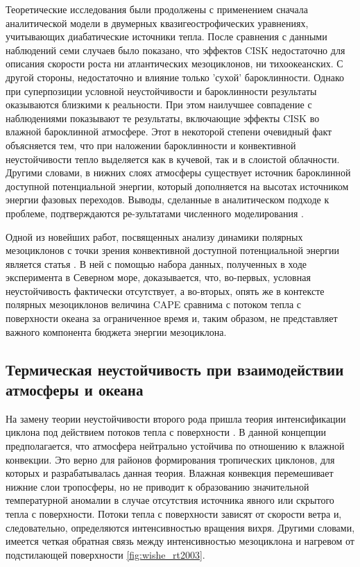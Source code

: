Теоретические исследования были продолжены с применением сначала аналитической модели \citep{SardieWarner1983} в двумерных квазигеострофических уравнениях, учитывающих диабатические источники тепла. После сравнения с данными наблюдений семи случаев было показано, что эффектов CISK недостаточно для описания скорости роста ни атлантических мезоциклонов, ни тихоокеанских. С другой стороны, недостаточно и влияние только 'сухой' бароклинности. Однако при суперпозиции условной неустойчивости и бароклинности результаты оказываются близкими к реальности. При этом наилучшее совпадение с наблюдениями показывают те результаты, включающие эффекты CISK во влажной бароклинной атмосфере. Этот в некоторой степени очевидный факт объясняется тем, что при наложении бароклинности и конвективной неустойчивости тепло выделяется как в кучевой, так и в слоистой облачности. Другими словами, в нижних слоях атмосферы существует источник бароклинной доступной потенциальной энергии, который дополняется на высотах источником энергии фазовых переходов. Выводы, сделанные в аналитическом подходе к проблеме, подтверждаются ре-зультатами численного моделирования \citep{SardieWarner1983}.

Одной из новейших работ, посвященных анализу динамики полярных мезоциклонов с точки зрения конвективной доступной потенциальной энергии является статья \citep{LindersSaetra2010}. В ней с помощью набора данных, полученных в ходе эксперимента в Северном море, доказывается, что, во-первых, условная неустойчивость фактически отсутствует, а во-вторых, опять же в контексте полярных мезоциклонов величина CAPE сравнима с потоком тепла с поверхности океана за ограниченное время и, таким образом, не представляет важного компонента бюджета энергии мезоциклона.

\subsection{Термическая неустойчивость при взаимодействии атмосферы и океана}
На замену теории неустойчивости второго рода пришла теория интенсификации циклона под действием потоков тепла с поверхности \citep{EmanuelRotunno1989}. В данной концепции предполагается, что атмосфера нейтрально устойчива по отношению к влажной конвекции. Это верно для районов формирования тропических циклонов, для которых и разрабатывалась данная теория. Влажная конвекция перемешивает нижние слои тропосферы, но не приводит к образованию значительной температурной аномалии в случае отсутствия источника явного или скрытого тепла с поверхности. Потоки тепла с поверхности зависят от скорости ветра и, следовательно, определяются интенсивностью вращения вихря. Другими словами, имеется четкая обратная связь между интенсивностью мезоциклона и нагревом от подстилающей поверхности \ref{fig:wishe_rt2003}.

